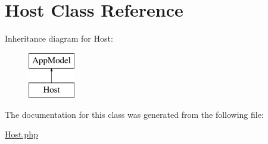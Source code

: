 \hypertarget{classHost}{
\section{\-Host \-Class \-Reference}
\label{classHost}
}
\-Inheritance diagram for \-Host\-:\begin{figure}[H]
\begin{center}
\leavevmode
\includegraphics[height=2.000000cm]{classHost}
\end{center}
\end{figure}


\-The documentation for this class was generated from the following file\-:\begin{DoxyCompactItemize}
\item 
\hyperlink{Host_8php}{\-Host.\-php}\end{DoxyCompactItemize}
